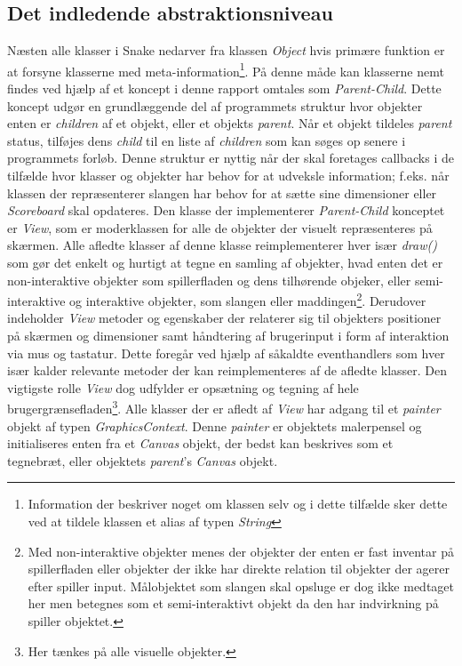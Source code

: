 \documentclass[]{article}
\begin{document}
	\subsection{Det indledende abstraktionsniveau}
	Næsten alle klasser i Snake nedarver fra klassen \textit{Object} hvis primære funktion er at forsyne klasserne med meta-information\footnote{Information der beskriver noget om klassen selv og i dette tilfælde sker dette ved at tildele klassen et alias af typen \textit{String}}. På denne måde kan klasserne nemt findes ved hjælp af et koncept i denne rapport omtales som \textit{Parent-Child}. Dette koncept udgør en grundlæggende del af programmets struktur hvor objekter enten er \textit{children} af et objekt, eller et objekts \textit{parent}. Når et objekt tildeles \textit{parent} status, tilføjes dens \textit{child} til en liste af \textit{children} som kan søges op senere i programmets forløb. Denne struktur er nyttig når der skal foretages callbacks i de tilfælde hvor klasser og objekter har behov for at udveksle information; f.eks. når klassen der repræsenterer slangen har behov for at sætte sine dimensioner eller \textit{Scoreboard} skal opdateres.
	Den klasse der implementerer \textit{Parent-Child} konceptet er \textit{View}, som er moderklassen for alle de objekter der visuelt repræsenteres på skærmen. Alle afledte klasser af denne klasse reimplementerer hver især \textit{draw()} som gør det enkelt og hurtigt at tegne en samling af objekter, hvad enten det er non-interaktive objekter som spillerfladen og dens tilhørende objeker, eller semi-interaktive og interaktive objekter, som slangen eller maddingen\footnote{Med non-interaktive objekter menes der objekter der enten er fast inventar på spillerfladen eller objekter der ikke har direkte relation til objekter der agerer efter spiller input. Målobjektet som slangen skal opsluge er  dog ikke medtaget her men betegnes som et semi-interaktivt objekt da den har indvirkning på spiller objektet.}.  Derudover indeholder \textit{View} metoder og egenskaber der relaterer sig til objekters positioner på skærmen og dimensioner samt håndtering af brugerinput i form af interaktion via mus og tastatur. Dette foregår ved hjælp af såkaldte eventhandlers som hver især kalder relevante metoder der kan reimplementeres af de afledte klasser. Den vigtigste rolle \textit{View} dog udfylder er opsætning og tegning af hele brugergrænsefladen\footnote{Her tænkes på alle visuelle objekter.}. Alle klasser der er afledt af \textit{View} har adgang til et \textit{painter} objekt af typen \textit{GraphicsContext}. Denne \textit{painter} er objektets malerpensel og initialiseres enten fra et \textit{Canvas} objekt, der bedst kan beskrives som et tegnebræt, eller objektets \textit{parent}'s \textit{Canvas} objekt.
	
\end{document}
